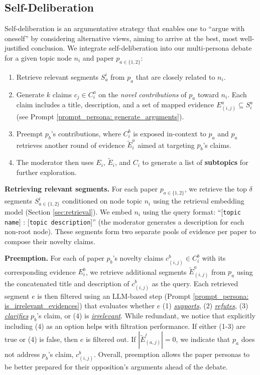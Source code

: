 \subsection{Self-Deliberation}
\label{sec:self-deliberate}
\par Self-deliberation is an argumentative strategy \cite{tindale2020self} that enables one to ``argue with oneself'' by considering alternative views, aiming to arrive at the best, most well-justified conclusion. We integrate self-deliberation into our multi-persona debate for a given topic node $n_i$ and paper $p_{a\in\{1,2\}}$:
\begin{enumerate}[leftmargin=*]
    \itemsep=0em
    \item Retrieve relevant segments $S_a^i$ from $p_a$ that are closely related to $n_i$.
    \item Generate $k$ claims $c_j \in C^a_i$ on the \textit{novel contributions} of $p_a$ toward $n_i$. Each claim includes a title, description, and a set of mapped evidence $E^a_{(i, j)}\subseteq S_i^a$ (see Prompt \ref{prompt_persona: generate_arguments}).
    \item Preempt $p_b$'s contributions, where $C^b_i$ is exposed in-context to $p_a$ and $p_a$ retrieves another round of evidence $\widetilde{E}^a_i$ aimed at targeting $p_b$'s claims.
    \item The moderator then uses $E_i$, $\widetilde{E}_i$, and $C_i$ to generate a list of \textbf{subtopics} for further exploration.
\end{enumerate}

\par{\textbf{Retrieving relevant segments.}} For each paper $p_{a\in\{1,2\}}$, we retrieve the top $\delta$ segments $S^i_{a\in\{1,2\}}$ conditioned on node topic $n_i$ using the retrieval embedding model \cite{bge_embedding} (Section \ref{sec:retrieval}). We embed $n_i$ using the query format: ``[\texttt{topic name}] : [\texttt{topic description}]'' (the moderator generates a description for each non-root node). These segments form two separate pools of evidence per paper to compose their novelty claims.

\par{\textbf{Preemption.}} For each of paper $p_b$'s novelty claims $c^b_{(i,j)} \in C^b_i$ with its corresponding evidence $E^b_i$, we retrieve additional segments $\widetilde{E}^a_{(i,j)}$ from $p_a$ using the concatenated title and description of $c^b_{(i,j)}$ as the query. Each retrieved segment $e$ is then filtered using an LLM-based step (Prompt \ref{prompt_persona: is_irrelevant_evidences}) that evaluates whether $e$ (1) \underline{\textit{supports}}, (2) \underline{\textit{refutes}}, (3) \underline{\textit{clarifies}} $p_b$'s claim, or (4) is \underline{\textit{irrelevant}}. While redundant, we notice that explicitly including (4) as an option helps with filtration performance. If either (1-3) are true or (4) is false, then $e$ is filtered out. If $|\widetilde{E}^i_{(a, j)}| = 0$, we indicate that $p_a$ does not address $p_b$'s claim, $c^b_{(i,j)}$. Overall, preemption allows the paper personas to be better prepared for their opposition's arguments ahead of the debate.

